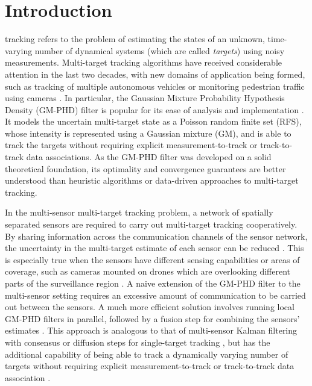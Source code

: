 \section{Introduction}
\label{sec:introduction}
 tracking refers to the problem of estimating the states of an unknown, time-varying number of dynamical systems (which are called \textit{targets}) using noisy measurements.
Multi-target tracking algorithms have received considerable attention in the last two decades, with new domains of application being formed, such as tracking of multiple autonomous vehicles or monitoring pedestrian traffic using cameras \cite{rangesh2019no, fu2019multi}. In particular, the Gaussian Mixture Probability Hypothesis Density (GM-PHD) filter is popular for its ease of analysis and implementation \cite{vo2006gmphd}. It models the uncertain multi-target state as a Poisson random finite set (RFS), whose intensity is represented using a Gaussian mixture (GM), and is able to track the targets without requiring explicit measurement-to-track or track-to-track data associations.
As the GM-PHD filter was developed on a solid theoretical foundation, its optimality and convergence guarantees are better understood than heuristic algorithms or data-driven approaches to multi-target tracking. 

In the multi-sensor multi-target tracking problem, a network of spatially separated sensors are required to carry out multi-target tracking cooperatively. By sharing information across the communication channels of the sensor network, the uncertainty in the multi-target estimate of each sensor can be reduced \cite{gostar2017cauchy}. This is especially true when the sensors have different sensing capabilities or areas of coverage, such as cameras mounted on drones which are overlooking different parts of the surveillance region \cite{battistelli2020differentFOVs}. A naive extension of the GM-PHD filter to the multi-sensor setting requires an excessive amount of communication to be carried out between the sensors. A much more efficient solution involves running local GM-PHD filters in parallel, followed by a fusion step for combining the sensors' estimates \cite{li2018cardinality, li2018partial, wu2022partial}. This approach is analogous to that of multi-sensor Kalman filtering with consensus or diffusion steps for single-target tracking \cite{talebi2018distributed}, but has the additional capability of being able to track a dynamically varying number of targets without requiring explicit measurement-to-track or track-to-track data association \cite{li2018partial}.

